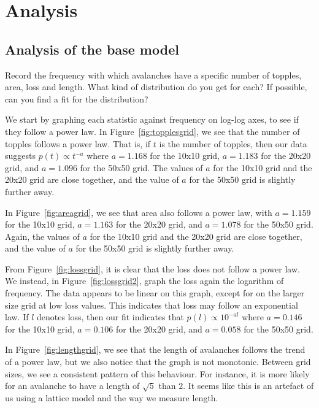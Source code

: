\chapter{Analysis}

\section{Analysis of the base model}

\begin{question}
    Record the frequency with which avalanches have a specific number of topples, area, loss and length. What kind of distribution do you get for each? If possible, can you find a fit for the distribution? 
\end{question}

We start by graphing each statistic against frequency on log-log axes, to see if they follow a power law. In Figure~\ref{fig:topplesgrid}, we see that the number of topples follows a power law. That is, if $t$ is the number of topples, then our data suggests $p(t)\propto t^{-a}$ where $a=1.168$ for the 10x10 grid, $a=1.183$ for the 20x20 grid, and $a=1.096$ for the 50x50 grid. The values of $a$ for the 10x10 grid and the 20x20 grid are close together, and the value of $a$ for the 50x50 grid is slightly further away. 

In Figure~\ref{fig:areagrid}, we see that area also follows a power law, with $a=1.159$ for the 10x10 grid, $a=1.163$ for the 20x20 grid, and $a=1.078$ for the 50x50 grid. Again, the values of $a$ for the 10x10 grid and the 20x20 grid are close together, and the value of $a$ for the 50x50 grid is slightly further away.

From Figure~\ref{fig:lossgrid}, it is clear that the loss does not follow a power law. We instead, in Figure~\ref{fig:lossgrid2}, graph the loss again the logarithm of frequency. The data appears to be linear on this graph, except for on the larger size grid at low loss values. This indicates that loss may follow an exponential law. If $l$ denotes loss, then our fit indicates that $p(l)\propto 10^{-al}$ where $a=0.146$ for the 10x10 grid, $a=0.106$ for the 20x20 grid, and $a=0.058$ for the 50x50 grid. 

In Figure~\ref{fig:lengthgrid}, we see that the length of avalanches follows the trend of a power law, but we also notice that the graph is not monotonic. Between grid sizes, we see a consistent pattern of this behaviour. For instance, it is more likely for an avalanche to have a length of $\sqrt{5}$ than $2$. It seems like this is an artefact of us using a lattice model and the way we measure length.


